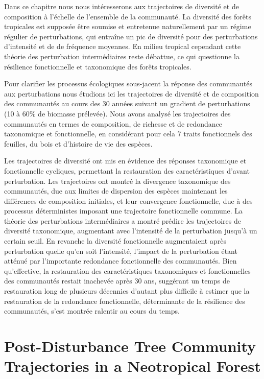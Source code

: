 \documentclass[
  11pt,
  french,
  A4paper,
  extrafontsizes,onecolumn,openright
  ]{memoir}
\begin{document}
Dans ce chapitre nous nous intéresserons aux trajectoires de diversité
et de composition à l'échelle de l'ensemble de la communauté. La
diversité des forêts tropicales est supposée être soumise et entretenue
naturellement par un régime régulier de perturbations, qui entraîne un
pic de diversité pour des perturbations d'intensité et de de fréquence
moyennes. En milieu tropical cependant cette théorie des perturbation
intermédiaires reste débattue, ce qui questionne la résilience
fonctionnelle et taxonomique des forêts tropicales.

Pour clarifier les processus écologiques sous-jacent la réponse des
communautés aux perturbations nous étudions ici les trajectoires de
diversité et de composition des communautés au cours des 30 années
suivant un gradient de perturbations (10 à 60\% de biomasse prélevée).
Nous avons analysé les trajectoires des communautés en termes de
composition, de richesse et de redondance taxonomique et fonctionnelle,
en considérant pour cela 7 traits fonctionnels des feuilles, du bois et
d'histoire de vie des espèces.

Les trajectoires de diversité ont mis en évidence des réponses
taxonomique et fonctionnelle cycliques, permettant la restauration des
caractéristiques d'avant perturbation. Les trajectoires ont montré la
divergence taxonomique des communautés, due aux limites de dispersion
des espèces maintenant les différences de composition initiales, et leur
convergence fonctionnelle, due à des processus déterministes imposant
une trajectoire fonctionnelle commune. La théorie des perturbations
intermédiaires a montré prédire les trajectoires de diversité
taxonomique, augmentant avec l'intensité de la perturbation jusqu'à un
certain seuil. En revanche la diversité fonctionnelle augmentaient après
perturbation quelle qu'en soit l'intensité, l'impact de la perturbation
étant atténué par l'importante redondance fonctionnelle des communautés.
Bien qu'effective, la restauration des caractéristiques taxonomiques et
fonctionnelles des communautés restait inachevée après 30 ans, suggérant
un temps de restauration long de plusieurs décennies d'autant plus
difficile à estimer que la restauration de la redondance fonctionnelle,
déterminante de la résilience des communautés, s'est montrée ralentir au
cours du temps.

\newpage

\section*{Post-Disturbance Tree Community Trajectories in a Neotropical
Forest}\label{post-disturbance-tree-community-trajectories-in-a-neotropical-forest}
\end{document}
